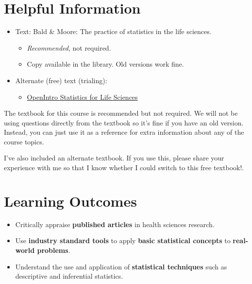 \documentclass[
  letterpaper,
  DIV=11,
  numbers=noendperiod]{scrreprt}
\providecommand{\tightlist}{%
  \setlength{\itemsep}{0pt}\setlength{\parskip}{0pt}}\usepackage{longtable,booktabs,array}
\def\lspace{}
\begin{document}
\hypertarget{helpful-information}{%
\section*{Helpful Information}\label{helpful-information}}


\begin{itemize}
\tightlist
\item
  Text: Bald \& Moore: The practice of statistics in the life sciences.

  \begin{itemize}
  \tightlist
  \item
    \emph{Recommended}, not required.
  \item
    Copy available in the library. Old versions work fine.\lspace
  \end{itemize}
\item
  Alternate (free) text (trialing):

  \begin{itemize}
  \tightlist
  \item
    \href{https://www.openintro.org/book/biostat/}{OpenIntro Statistics
    for Life Sciences}
  \end{itemize}
\end{itemize}

The textbook for this course is recommended but not required. We will
not be using questions directly from the textbook so it's fine if you
have an old version. Instead, you can just use it as a reference for
extra information about any of the course topics.

I've also included an alternate textbook. If you use this, please share
your experience with me so that I know whether I could switch to this
free textbook!.

\hypertarget{learning-outcomes}{%
\section*{Learning Outcomes}\label{learning-outcomes}}


\begin{itemize}
\tightlist
\item
  Critically appraise \textbf{published articles} in health sciences
  research.\lspace
\item
  Use \textbf{industry standard tools} to apply \textbf{basic
  statistical concepts} to \textbf{real-world problems}.\lspace
\item
  Understand the use and application of \textbf{statistical techniques}
  such as descriptive and inferential statistics.
\end{itemize}
\end{document}
